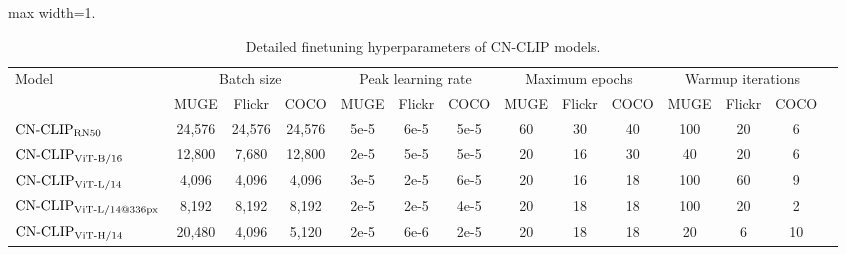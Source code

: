 \begin{table}[t]
\center
\begin{adjustbox}{max width=1.\textwidth}
\begin{tabular}{@{\extracolsep{\fill}}lccccccccccccc}
\toprule
  \multirow{2}{*}{Model}
  & \multicolumn{3}{c}{Batch size}
  & \multicolumn{3}{c}{Peak learning rate}
  & \multicolumn{3}{c}{Maximum epochs}
  & \multicolumn{3}{c}{Warmup iterations}

  \\
  & MUGE
  & Flickr
  & COCO
  & MUGE
  & Flickr
  & COCO
  & MUGE
  & Flickr
  & COCO
  & MUGE
  & Flickr
  & COCO
  \\
\midrule
    $\text{CN-CLIP}\rm_{RN50}$
    & 24,576
    & 24,576
    & 24,576
    & 5e-5
    & 6e-5
    & 5e-5
    & 60
    & 30
    & 40
    & 100
    & 20
    & 6
    \\
    $\text{CN-CLIP}\rm_{ViT\text{-}B/16}$
    & 12,800
    & 7,680
    & 12,800
    & 2e-5
    & 5e-5
    & 5e-5
    & 20
    & 16
    & 30
    & 40
    & 20
    & 6
    \\
    $\text{CN-CLIP}\rm_{ViT\text{-}L/14}$
    & 4,096
    & 4,096
    & 4,096
    & 3e-5
    & 2e-5
    & 6e-5
    & 20
    & 16
    & 18
    & 100
    & 60
    & 9
    \\
    $\text{CN-CLIP}\rm_{ViT\text{-}L/14@336px}$
    & 8,192
    & 8,192
    & 8,192
    & 2e-5
    & 2e-5
    & 4e-5
    & 20
    & 18
    & 18
    & 100
    & 20
    & 2
    \\
    $\text{CN-CLIP}\rm_{ViT\text{-}H/14}$
    & 20,480
    & 4,096
    & 5,120
    & 2e-5
    & 6e-6
    & 2e-5
    & 20
    & 18
    & 18
    & 20
    & 6
    & 10
    \\
\bottomrule
\end{tabular}
\end{adjustbox}
\caption{Detailed finetuning hyperparameters of CN-CLIP models.}
\label{tb:detailed_finetune}
\end{table}

% 